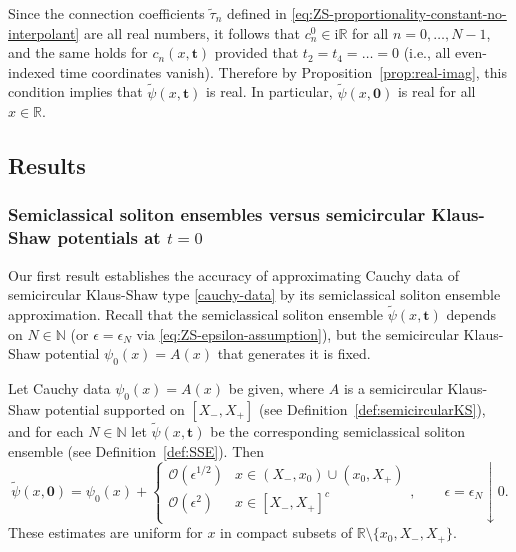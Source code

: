 \documentclass[12pt]{amsart}
\numberwithin{equation}{section}
\newcommand{\ii}{\mathrm{i}}
\newcommand{\R}{\mathbb{R}}
\newcommand{\eps}{\epsilon}
\newcommand{\bigo}[1]{ \mathcal{O}\! \left( #1 \right) }
\begin{document}
Since the connection coefficients $\widetilde{\tau}_n$ defined in \eqref{eq:ZS-proportionality-constant-no-interpolant} are all real numbers, it follows that $c_n^0\in\ii\mathbb{R}$ for all $n=0,\dots,N-1$, and the same holds for $c_n(x,\mathbf{t})$ provided that $t_2=t_4=\dots=0$ (i.e., all even-indexed time coordinates vanish).  Therefore by Proposition~\ref{prop:real-imag}, this condition implies that $\widetilde{\psi}(x,\mathbf{t})$ is real.  In particular, $\widetilde{\psi}(x,\mathbf{0})$ is real for all $x\in\mathbb{R}$.



\subsection{Results}
\label{sec-results}
\subsubsection{Semiclassical soliton ensembles versus semicircular Klaus-Shaw potentials at $t=0$}
Our first result establishes the accuracy of approximating Cauchy data of semicircular Klaus-Shaw type \eqref{cauchy-data} by its semiclassical soliton ensemble approximation.   Recall that the semiclassical soliton ensemble $\widetilde{\psi}(x,\mathbf{t})$ depends on $N\in\mathbb{N}$ (or $\eps=\eps_N$ via \eqref{eq:ZS-epsilon-assumption}), but the semicircular Klaus-Shaw potential $\psi_0(x)=A(x)$ that generates it is fixed.
\begin{thm}

Let Cauchy data $\psi_0(x) =A(x)$ be given, where $A$ is a semicircular Klaus-Shaw potential  supported on $[X_-, X_+]$ (see Definition~\ref{def:semicircularKS}), and for each $N \in \mathbb{N}$ let $\widetilde{\psi}(x,\mathbf{t})$ be the corresponding semiclassical soliton ensemble (see Definition~\ref{def:SSE}). Then  
\begin{equation}
	\widetilde{\psi}(x,\mathbf{0}) = \psi_0(x) + 
	\begin{cases}  
	    \bigo{\eps^{1/2}} & x \in (X_-,x_0)\cup(x_0, X_+) \\
	    \bigo{\eps^{2}} & x \in [X_-, X_+]^c \\
	\end{cases}
	, \qquad \eps=\eps_N \downarrow 0.
\end{equation} 
These estimates are uniform for $x$ in compact subsets of $\R \setminus \{x_0, X_-, X_+\}$. 
\label{thm-accuracy-t=0}
\end{thm}
\end{document}
